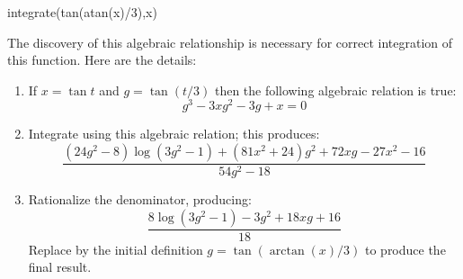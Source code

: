 {{{{{{{{\begin{xtc}
\begin{xtccomment}
\end{xtccomment}
\begin{spadsrc}
integrate(tan(atan(x)/3),x)
\end{spadsrc}
\begin{TeXOutput}
\begin{fricasmath}{8}
%
\end{fricasmath}
\end{TeXOutput}
\end{xtc}
\noindent
The discovery of this algebraic relationship is necessary for correct
integration of this function.
Here are the details:
\begin{enumerate}
\item
If $x=\tan t$ and
$g=\tan (t/3)$ then the following
algebraic relation is true:
$${g^3-3xg^2-3g+x=0}$$
\item
Integrate  using this algebraic relation; this produces:
\begin{displaymath}
\frac{(24g^2 - 8)\log(3g^2 - 1) + (81x^2 + 24)g^2 + 72xg - 27x^2 - 16}%
  {54g^2 - 18}
\end{displaymath}
\item
Rationalize the denominator, producing:
\begin{displaymath}
\frac{8\log(3g^2-1) - 3g^2 + 18xg + 16}{18}
\end{displaymath}
Replace  by the initial definition
$g = \tan(\arctan(x)/3)$
to produce the final result.
\end{enumerate}

}}}}}}}}
